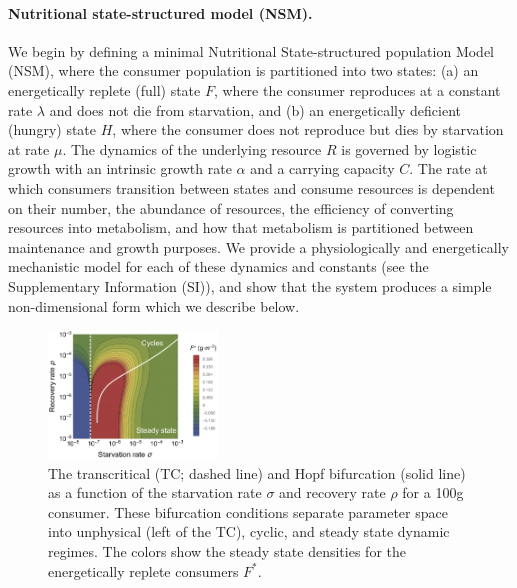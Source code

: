 \documentclass[twocolumn,preprintnumbers,amsmath,amssymb,superscriptaddress]{revtex4}
\begin{document}
\noindent \paragraph*{{\bf Nutritional state-structured model (NSM).}}
We begin by defining a minimal Nutritional State-structured population Model
(NSM), where the consumer population is partitioned into two states: (a) an
energetically replete (full) state $F$, where the consumer reproduces at a
constant rate $\lambda$ and does not die from starvation, and (b) an
energetically deficient (hungry) state $H$, where the consumer does not
reproduce but dies by starvation at rate $\mu$. The dynamics of the
underlying resource $R$ is governed by logistic growth with an intrinsic
growth rate $\alpha$ and a carrying capacity $C$. The rate at which consumers
transition between states and consume resources is dependent on their number,
the abundance of resources, the efficiency of converting resources into
metabolism, and how that metabolism is partitioned between maintenance and
growth purposes.  We provide a physiologically and energetically mechanistic
model for each of these dynamics and constants (see the Supplementary Information
(SI)), and show that the system produces a simple non-dimensional form which
we describe below.

\begin{figure}
\centering
\includegraphics[width=0.4\textwidth]{fig_FixedPoint2.eps}
\caption{\small{ The transcritical (TC; dashed line) and Hopf bifurcation (solid line) as a
  function of the starvation rate $\sigma$ and recovery rate $\rho$ for a 100g consumer.  These
  bifurcation conditions separate parameter space into unphysical (left of the TC), cyclic,
  and steady state dynamic regimes.  The colors show the steady state densities for the energetically replete consumers $F^*$.  
}\label{fig:fp}}
\end{figure}
\end{document}
